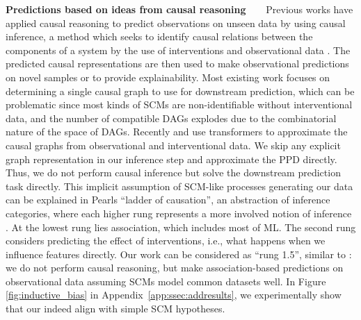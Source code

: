 \documentclass{article}
\newcommand{\slimparagraph}[1]{\textbf{#1~~~}}
\begin{document}
\slimparagraph{Predictions based on ideas from causal reasoning}
%
Previous works have applied causal reasoning to predict observations on unseen data by using causal inference, a method which seeks to identify causal relations between the components of a system by the use of interventions and observational data \citep{pearl2010causal, PearlMackenzie18, lin2021scoping}. 
The predicted causal representations are then used to make observational predictions on novel samples or to provide explainability.
Most existing work focuses on determining a single causal graph to use for downstream prediction, which can be problematic since most kinds of SCMs are non-identifiable without interventional data, and the number of compatible DAGs explodes due to the combinatorial nature of the space of DAGs.
Recently \citet{ke2022} and \citet{lorch2022amortized} use transformers to approximate the causal graphs from observational and interventional data.
We skip any explicit graph representation in our inference step and approximate the PPD directly.
Thus, we do not perform causal inference but solve the downstream prediction task directly.
This implicit assumption of SCM-like processes generating our data can be explained in Pearl\textquotesingle{}s ``ladder of causation'', an abstraction of inference categories, where each higher rung represents a more involved notion of inference \citep{PearlMackenzie18}. At the lowest rung lies association, which includes most of ML. The second rung considers predicting the effect of interventions, i.e., what happens when we influence features directly. %
Our work can be considered as ``rung 1.5'', similar to \cite{NEURIPS2020_1068bceb, SchaarMiracleCDL}: we do not perform causal reasoning, but make association-based predictions on observational data assuming SCMs model common datasets well. In Figure \ref{fig:inductive_bias} in Appendix~\ref{app:ssec:addresults}, we experimentally show that our indeed align with simple SCM hypotheses.
\end{document}
